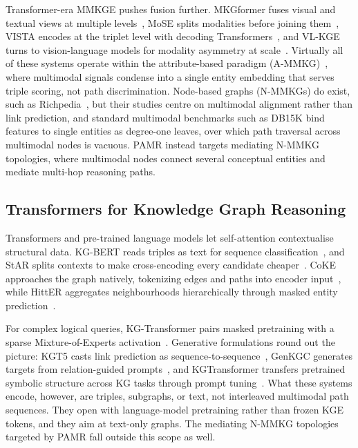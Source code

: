 \documentclass[runningheads]{llncs}
\begin{document}
Transformer-era MMKGE pushes fusion further. MKGformer fuses visual and textual views at multiple levels~\cite{chen2022mkgformer}, MoSE splits modalities before joining them~\cite{zhao2022mose}, VISTA encodes at the triplet level with decoding Transformers~\cite{lee2023vista}, and VL-KGE turns to vision-language models for modality asymmetry at scale~\cite{efthymiou2026vlkge}. Virtually all of these systems operate within the attribute-based paradigm (A-MMKG)~\cite{zhu2024multimodal}, where
multimodal signals condense into a single entity embedding that serves triple scoring, not path discrimination. Node-based graphs (N-MMKGs) do exist, such as Richpedia~\cite{wang2020richpedia}, but their studies centre on multimodal alignment rather than link prediction, and standard multimodal benchmarks such as DB15K bind features to single entities as degree-one leaves, over which path traversal across multimodal nodes is vacuous. PAMR instead targets mediating N-MMKG topologies, where multimodal nodes connect several conceptual entities and mediate multi-hop reasoning paths.

\subsection{Transformers for Knowledge Graph Reasoning}
\label{sec:rw-transformers}

Transformers and pre-trained language models let self-attention contextualise structural data. KG-BERT reads triples as text for sequence classification~\cite{yao2019kg}, and StAR splits contexts to make cross-encoding every candidate cheaper~\cite{wang2021star}. CoKE approaches the graph natively, tokenizing edges and paths into encoder input~\cite{wang2019coke}, while HittER aggregates neighbourhoods hierarchically through masked entity prediction~\cite{chen2021hitter}.

For complex logical queries, KG-Transformer pairs masked pretraining with a sparse Mixture-of-Experts activation~\cite{liu2022mask}. Generative formulations round out the picture: KGT5 casts link prediction as sequence-to-sequence~\cite{saxena2022kgt5}, GenKGC generates targets from relation-guided prompts~\cite{zhu2022genkgc}, and KGTransformer transfers pretrained symbolic structure across KG tasks through prompt tuning~\cite{zhang2023kgtransformer}. What these systems encode, however, are triples, subgraphs, or text, not interleaved multimodal path sequences. They open with language-model pretraining rather than frozen KGE tokens, and they aim at text-only graphs. The mediating N-MMKG topologies targeted by PAMR fall outside this scope as well.
\end{document}
